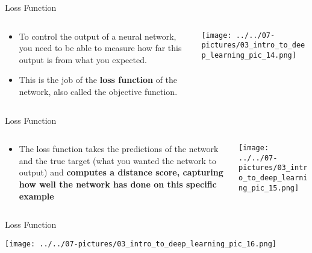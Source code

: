 \documentclass[11pt]{beamer}
\begin{document}
\begin{frame}{Loss Function}
\begin{columns}[T] %
\begin{column}{.48\textwidth}
        \begin{itemize}
		\item To control the output of a neural network, you need to be able to measure how far this output is from what you expected. 
		\item This is the job of the \textbf{loss function} of the network, also called the objective function. 
        \end{itemize}
\end{column}%
\hfill%
\begin{column}{.48\textwidth}
        \texttt{[image: ../../07-pictures/03\_intro\_to\_deep\_learning\_pic\_14.png]}
\end{column}%
\end{columns}
\end{frame}
\begin{frame}{Loss Function}
\begin{columns}[T] %
\begin{column}{.48\textwidth}
        \begin{itemize}
		\item The loss function takes the predictions of the network and the true target (what you wanted the network to output) and \textbf{computes a distance score, capturing how well the network has done on this specific example}
        \end{itemize}
\end{column}%
\hfill%
\begin{column}{.48\textwidth}
        \texttt{[image: ../../07-pictures/03\_intro\_to\_deep\_learning\_pic\_15.png]}
\end{column}%
\end{columns}
\end{frame}
\begin{frame}{Loss Function}
	\begin{center}
	\texttt{[image: ../../07-pictures/03\_intro\_to\_deep\_learning\_pic\_16.png]}
	\end{center}
\end{frame}
\end{document}
